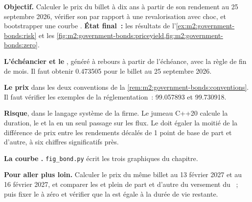 \begin{tutorial}
\textbf{Objectif.} Calculer le prix du billet à dix ans à partir de son rendement au 25 septembre 2026,
vérifier son  par rapport à une revalorisation avec choc, et bootstrapper une courbe .
\textbf{État final~:} les résultats de l'\cref{ex:m2:government-bonds:risk} et
les \cref{fig:m2:government-bonds:priceyield,fig:m2:government-bonds:zero}.
\begin{tutsteps}
\item \textbf{L'échéancier et le }, généré à rebours à partir de
l'échéance, avec la règle de fin de mois.
\label{lst:m2:government-bonds:schedule}
Il faut obtenir 0.473505 pour le billet au 25 septembre 2026.
\item \textbf{Le prix} dans les deux conventions de la \cref{rem:m2:government-bonds:conventions}.
\label{lst:m2:government-bonds:dirty}
Il faut vérifier les exemples de la réglementation~: 99.057893 et 99.730918.
\item \textbf{Risque}, dans le langage système de la firme. Le jumeau C++20
calcule la duration, le  et la  en un seul passage sur les flux.
\label{lst:m2:government-bonds:risk}
Le  doit égaler la moitié de la différence de prix entre les rendements
décalés de 1 point de base de part et d'autre, à six chiffres significatifs près.
\item \textbf{La courbe .}
\label{lst:m2:government-bonds:bootstrap}
\texttt{fig\_bond.py} écrit les trois graphiques du chapitre.
\end{tutsteps}
\textbf{Pour aller plus loin.} Calculer le prix du même billet au 13 février 2027 et au
16 février 2027, et comparer les  et plein  de part et d'autre du versement du ~; puis
fixer le  à zéro et vérifier que la  est égale à la
durée de vie restante.
\end{tutorial}

